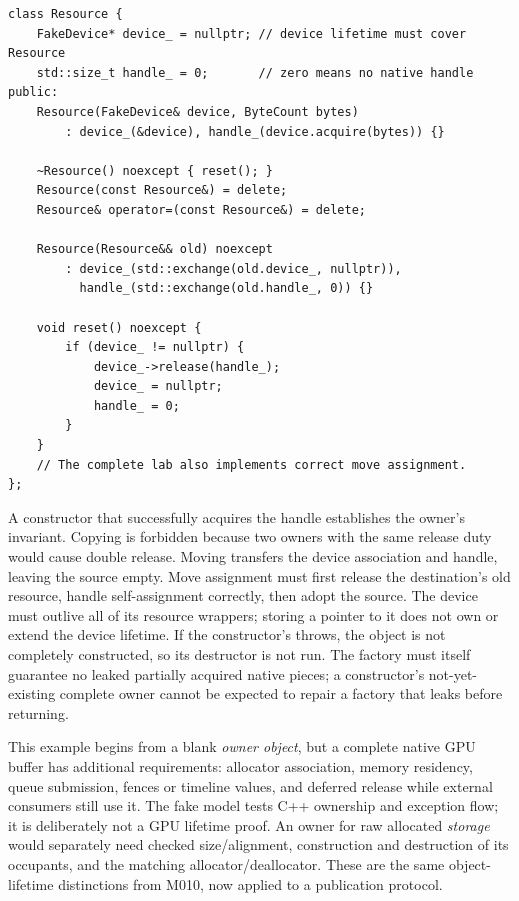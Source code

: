 \begin{verbatim}
class Resource {
    FakeDevice* device_ = nullptr; // device lifetime must cover Resource
    std::size_t handle_ = 0;       // zero means no native handle
public:
    Resource(FakeDevice& device, ByteCount bytes)
        : device_(&device), handle_(device.acquire(bytes)) {}

    ~Resource() noexcept { reset(); }
    Resource(const Resource&) = delete;
    Resource& operator=(const Resource&) = delete;

    Resource(Resource&& old) noexcept
        : device_(std::exchange(old.device_, nullptr)),
          handle_(std::exchange(old.handle_, 0)) {}

    void reset() noexcept {
        if (device_ != nullptr) {
            device_->release(handle_);
            device_ = nullptr;
            handle_ = 0;
        }
    }
    // The complete lab also implements correct move assignment.
};
\end{verbatim}

A constructor that successfully acquires the handle establishes the owner's invariant. Copying is forbidden because two owners with the same release duty would cause double release. Moving transfers the device association and handle, leaving the source empty. Move assignment must first release the destination's old resource, handle self-assignment correctly, then adopt the source. The device must outlive all of its resource wrappers; storing a pointer to it does not own or extend the device lifetime. If the constructor's  throws, the  object is not completely constructed, so its destructor is not run. The factory must itself guarantee no leaked partially acquired native pieces; a constructor's not-yet-existing complete owner cannot be expected to repair a factory that leaks before returning.

This example begins from a blank \emph{owner object}, but a complete native GPU buffer has additional requirements: allocator association, memory residency, queue submission, fences or timeline values, and deferred release while external consumers still use it. The fake model tests C++ ownership and exception flow; it is deliberately not a GPU lifetime proof. An owner for raw allocated \emph{storage} would separately need checked size/alignment, construction and destruction of its occupants, and the matching allocator/deallocator. These are the same object-lifetime distinctions from M010, now applied to a publication protocol.

